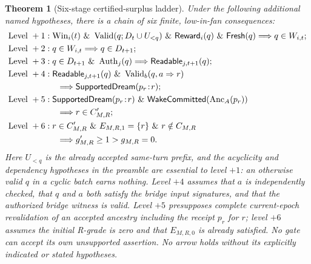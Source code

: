 \documentclass[11pt,letterpaper]{article}
\newtheorem{theorem}{Theorem}[section]
\newcommand{\Win}{\operatorname{Win}}
\newcommand{\Valid}{\operatorname{Valid}}
\newcommand{\Anc}{\operatorname{Anc}}
\newcommand{\Auth}{\operatorname{Auth}}
\begin{document}
\begin{theorem}[Six-stage certified-surplus ladder]\label{thm:six}
Under the following additional named hypotheses, there is a chain of six finite, low-in-fan consequences:
\begin{align*}
\text{Level }+1 &: \Win_i(t) \ \&\ \Valid(q;D_t\cup U_{<q}) \ \&\ \mathsf{Reward}_i(q)\ \&\ \mathsf{Fresh}(q)\Longrightarrow q\in W_{i,t};\\
\text{Level }+2 &: q\in W_{i,t}\Longrightarrow q\in D_{t+1};\\
\text{Level }+3 &: q\in D_{t+1}\ \&\ \Auth_j(q) \Longrightarrow \mathsf{Readable}_{j,t+1}(q);\\
\text{Level }+4 &: \mathsf{Readable}_{j,t+1}(q)\ \&\ \Valid_b(q,a\Rightarrow r)\\
&\hspace{5mm}\Longrightarrow\mathsf{SupportedDream}(p_r\!:\!r);\\
\text{Level }+5 &: \mathsf{SupportedDream}(p_r\!:\!r)\ \&\ \mathsf{WakeCommitted}(\Anc_A(p_r))\\
&\hspace{5mm}\Longrightarrow r\in C'_{M,R};\\
\text{Level }+6 &: r\in C'_{M,R}\ \&\ E_{M,R,1}=\{r\}\ \&\ r\notin C_{M,R}\\
&\hspace{5mm}\Longrightarrow g'_{M,R}\ge1>g_{M,R}=0.
\end{align*}
Here $U_{<q}$ is the already accepted \emph{same-turn prefix}, and the acyclicity and dependency hypotheses in the preamble are essential to level $+1$: an otherwise valid $q$ in a cyclic batch earns nothing. Level $+4$ assumes that $a$ is independently checked, that $q$ and $a$ both satisfy the bridge input signatures, and that the authorized bridge witness is valid. Level $+5$ presupposes complete current-epoch revalidation of an accepted ancestry \emph{including the receipt $p_r$ for $r$}; level $+6$ assumes the initial R-grade is zero and that $E_{M,R,0}$ is already satisfied. No gate can accept its own unsupported assertion. No arrow holds without its explicitly indicated or stated hypotheses.
\end{theorem}
\end{document}

